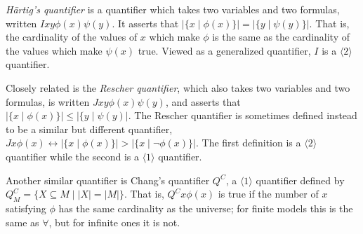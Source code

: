 \documentclass[12pt]{article}
\begin{document}
\emph{H\"artig's quantifier} is a quantifier which takes two variables and two formulas, written $Ixy\phi(x)\psi(y)$.  It asserts that $|\{x\mid \phi(x)\}|=|\{y\mid\psi(y)\}|$.  That is, the cardinality of the values of $x$ which make $\phi$ is the same as the cardinality of the values which make $\psi(x)$ true.  Viewed as a generalized quantifier, $I$ is a $\langle 2\rangle$ quantifier.

Closely related is the \emph{Rescher quantifier}, which also takes two variables and two formulas, is written $Jxy\phi(x)\psi(y)$, and asserts that $|\{x\mid \phi(x)\}|\leq|\{y\mid\psi(y)|$.  The Rescher quantifier is sometimes defined instead to be a similar but different quantifier, $Jx\phi(x)\leftrightarrow |\{x\mid\phi(x)\}|>|\{x\mid\neg\phi(x)\}|$.  The first definition is a $\langle 2\rangle$ quantifier while the second is a $\langle 1\rangle$ quantifier.

Another similar quantifier is Chang's quantifier $Q^C$, a $\langle 1\rangle$ quantifier defined by $Q^C_M=\{X\subseteq M\mid |X|=|M|\}$.  That is, $Q^Cx\phi(x)$ is true if the number of $x$ satisfying $\phi$ has the same cardinality as the universe; for finite models this is the same as $\forall$, but for infinite ones it is not.
\end{document}
